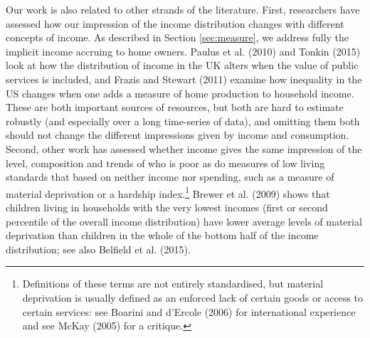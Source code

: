 Our work is also related to other strands of the literature. First, researchers have assessed how our impression of the income distribution changes with different concepts of income. As described in Section \ref{sec:measure}, we address fully the implicit income accruing to home owners. Paulus et al. (2010) and Tonkin (2015) look at how the distribution of income in the UK alters when the value of public services is included, and Frazis and Stewart (2011) examine how inequality in the US changes when one adds a measure of home production to household income. These are both important sources of resources, but both are hard to estimate robustly (and especially over a long time-series of data), and omitting them both should not change the different impressions given by income and consumption. Second, other work has assessed whether income gives the same impression of the level, composition and trends of who is poor as do measures of low living standards that based on neither income nor spending, such as a measure of material deprivation or a hardship index.\footnote{ Definitions of these terms are not entirely standardised, but material deprivation is usually defined as an enforced lack of certain goods or access to certain services: see Boarini and d'Ercole (2006) for international experience and see McKay (2005) for a critique.} Brewer et al. (2009) shows that children living in households with the very lowest incomes (first or second percentile of the overall income distribution) have lower average levels of material deprivation than children in the whole of the bottom half of the income distribution; see also Belfield et al. (2015).


